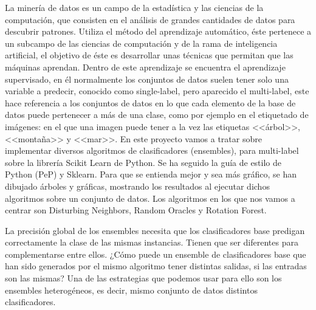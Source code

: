 
La minería de datos es un campo de la estadística y las ciencias de la computación, que consisten en el análisis de grandes cantidades de datos para descubrir patrones.
Utiliza el método del aprendizaje automático, éste pertenece a un subcampo de las ciencias de computación y de la rama de inteligencia artificial, el objetivo de éste es desarrollar unas técnicas que permitan que las máquinas aprendan.
Dentro de este aprendizaje se encuentra el aprendizaje supervisado, en él normalmente los conjuntos de datos suelen tener solo una variable a predecir, conocido como single-label, pero aparecido el multi-label, este hace referencia a los conjuntos de datos en lo que cada elemento de la base de datos puede pertenecer a más de una clase, como por ejemplo en el etiquetado de imágenes: en el que una imagen puede tener a la vez las etiquetas <<árbol>>, <<montaña>> y <<mar>>.
En este proyecto vamos a tratar sobre implementar diversos algoritmos de clasificadores (ensembles), para multi-label sobre la librería Scikit Learn de Python. Se ha seguido la guía de estilo de Python (PeP) y Sklearn. Para que se entienda mejor y sea más gráfico, se han dibujado árboles y gráficas, mostrando los resultados al ejecutar dichos algoritmos sobre un conjunto de datos. Los algoritmos en los que nos vamos a centrar son Disturbing Neighbors, Random Oracles y Rotation Forest.

La precisión global de los ensembles necesita que los clasificadores base predigan correctamente la clase de las mismas instancias.
Tienen que ser diferentes para complementarse entre ellos. 
¿Cómo puede un ensemble de clasificadores base que han sido generados por el mismo algoritmo tener distintas salidas, si las entradas son las mismas? Una de las estrategias que podemos usar para ello son los ensembles heterogéneos, es decir, mismo conjunto de datos distintos clasificadores. 
